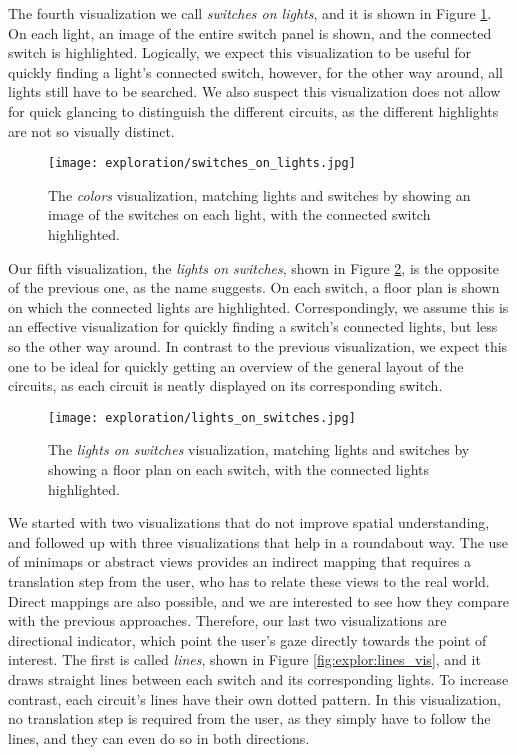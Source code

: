 The fourth visualization we call \textit{switches on lights}, and it is shown in Figure \ref{fig:explor:switches_on_lights_vis}. On each light, an image of the entire switch panel is shown, and the connected switch is highlighted. Logically, we expect this visualization to be useful for quickly finding a light's connected switch, however, for the other way around, all lights still have to be searched. We also suspect this visualization does not allow for quick glancing to distinguish the different circuits, as the different highlights are not so visually distinct.

\begin{figure}
    \centering
    \texttt{[image: exploration/switches\_on\_lights.jpg]}
    \caption{The \textit{colors} visualization, matching lights and switches by showing an image of the switches on each light, with the connected switch highlighted.}
    \label{fig:explor:switches_on_lights_vis}
\end{figure}

Our fifth visualization, the \textit{lights on switches}, shown in Figure \ref{fig:explor:lights_on_switches_vis}, is the opposite of the previous one, as the name suggests. On each switch, a floor plan is shown on which the connected lights are highlighted. Correspondingly, we assume this is an effective visualization for quickly finding a switch's connected lights, but less so the other way around. In contrast to the previous visualization, we expect this one to be ideal for quickly getting an overview of the general layout of the circuits, as each circuit is neatly displayed on its corresponding switch.

\begin{figure}
    \centering
    \texttt{[image: exploration/lights\_on\_switches.jpg]}
    \caption{The \textit{lights on switches} visualization, matching lights and switches by showing a floor plan on each switch, with the connected lights highlighted.}
    \label{fig:explor:lights_on_switches_vis}
\end{figure}

We started with two visualizations that do not improve spatial understanding, and followed up with three visualizations that help in a roundabout way. The use of minimaps or abstract views provides an indirect mapping that requires a translation step from the user, who has to relate these views to the real world. Direct mappings are also possible, and we are interested to see how they compare with the previous approaches. Therefore, our last two visualizations are directional indicator, which point the user's gaze directly towards the point of interest. The first is called \textit{lines}, shown in Figure \ref{fig:explor:lines_vis}, and it draws straight lines between each switch and its corresponding lights. To increase contrast, each circuit's lines have their own dotted pattern. In this visualization, no translation step is required from the user, as they simply have to follow the lines, and they can even do so in both directions.

